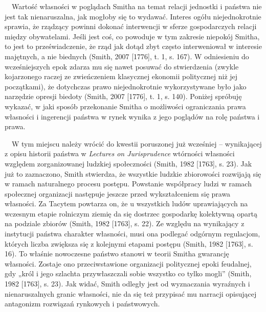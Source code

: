 \documentclass[a4paper]{article}
\begin{document}
\ \ Wartość własności w poglądach Smitha na temat relacji jednostki i państwa nie jest tak nienaruszalna, jak mogłoby się to wydawać. Interes ogółu niejednokrotnie sprawia, że rządzący powinni dokonać interwencji w sferze gospodarczych relacji między obywatelami. Jeśli jest coś, co powoduje w tym zakresie niepokój Smitha, to jest to przeświadczenie, że rząd jak dotąd zbyt często interweniował w interesie majętnych, a nie biednych \label{ref:RNDKTNonQx9Ln}(Smith, 2007 [1776], t. 1, s. 167). W odniesieniu do wcześniejszych epok zdarza mu się nawet posuwać do stwierdzenia (zwykle kojarzonego raczej ze zwieńczeniem klasycznej ekonomii politycznej niż jej początkami), że dotychczas prawo niejednokrotnie wykorzystywane było jako narzędzie opresji biedoty \label{ref:RNDK2BdJNopfX}(Smith, 2007 [1776], t. 1, s. 140). Poniżej spróbuję wykazać, w jaki sposób przekonanie Smitha o możliwości ograniczania prawa własności i ingerencji państwa w rynek wynika z jego poglądów na rolę państwa i prawa.

\ \ W tym miejscu należy wrócić do kwestii poruszonej już wcześniej – wynikającej z opisu historii państwa w \textit{Lectures on Jurisprudence} wtórności własności względem zorganizowanej ludzkiej społeczności \label{ref:RNDH9LUKQOk30}(Smith, 1982 [1763], s. 23). Jak już to zaznaczono, Smith stwierdza, że wszystkie ludzkie zbiorowości rozwijają się w ramach naturalnego procesu postępu. Powstanie współpracy ludzi w ramach społecznej organizacji następuje jeszcze przed wykształceniem się prawa własności. Za Tacytem powtarza on, że u wszystkich ludów uprawiających na wczesnym etapie rolniczym ziemię da się dostrzec gospodarkę kolektywną opartą na podziale zbiorów \label{ref:RNDYghmRxhXTi}(Smith, 1982 [1763], s. 22). Ze względu na wynikający z instytucji państwa charakter własności, musi ona podlegać odgórnym regulacjom, których liczba zwiększa się z kolejnymi etapami postępu \label{ref:RND1yCVEykFX7}(Smith, 1982 [1763], s. 16). To właśnie nowoczesne państwo stanowi w teorii Smitha gwarancję własności. Zostaje ono przeciwstawione organizacji politycznej epoki feudalnej, gdy „król i jego szlachta przywłaszczali sobie wszystko co tylko mogli” \label{ref:RNDcpxaJZ2IE6}(Smith, 1982 [1763], s. 23). Jak widać, Smith odległy jest od wyznaczania wyraźnych i nienaruszalnych granic własności, nie da się też przypisać mu narracji opisującej antagonizm rozwiązań rynkowych i państwowych.
\end{document}
